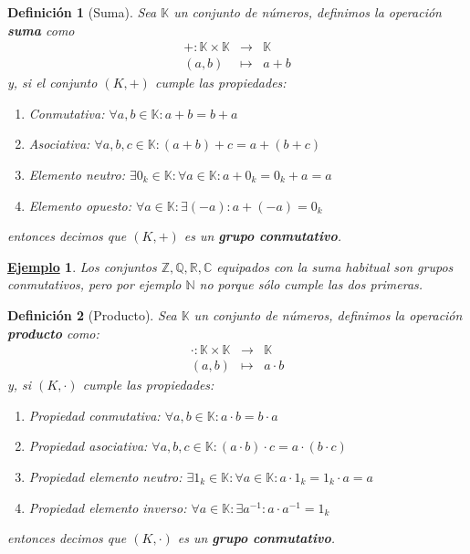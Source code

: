 \documentclass[10pt,a4paper,openright]{book}
\theoremstyle{break}
\newtheorem{defi}{Definición}[chapter]
\newtheorem{ej}{\underline{Ejemplo}}[chapter]
\begin{document}
\begin{defi}[Suma]
Sea $\mathbb K$ un conjunto de números, definimos la operación \textbf{suma} como
\begin{eqnarray*}
+: \mathbb K \times\mathbb K & \longrightarrow & \mathbb K \\
(a,b) & \longmapsto  & a+b
\end{eqnarray*}
y, si el conjunto $(K, +)$ cumple las propiedades:
\begin{enumerate}
\item Conmutativa: $\forall a, b \in \mathbb K: a+b=b+a$
\item Asociativa: $\forall a, b, c\in \mathbb K : (a+b)+c=a+(b+c)$
\item Elemento neutro: $\exists 0_k\in \mathbb K : \forall a \in \mathbb K : a+0_k=0_k+a=a$
\item Elemento opuesto: $\forall a \in \mathbb K : \exists (-a) : a+(-a)=0_k$
\end{enumerate}
entonces decimos que $(K,+)$ es un \textbf{grupo conmutativo}.
\end{defi}

\begin{ej}
Los conjuntos $\mathbb {Z, Q, R, C}$ equipados con la suma habitual son grupos conmutativos, pero por ejemplo $\mathbb N$ no porque sólo cumple las dos primeras.
\end{ej}

\begin{defi}[Producto]
Sea $\mathbb K$ un conjunto de números, definimos la operación \textbf{producto} como:
\begin{eqnarray*}
\cdot: \mathbb K \times\mathbb K & \longrightarrow & \mathbb K \\
(a,b) & \longmapsto  & a\cdot b
\end{eqnarray*}
y, si $(K, \cdot)$ cumple las propiedades:
\begin{enumerate}
\item Propiedad conmutativa: $\forall a, b \in \mathbb K: a\cdot b=b\cdot a$
\item Propiedad asociativa: $\forall a, b, c\in \mathbb K : (a\cdot b)\cdot c=a\cdot (b\cdot c)$
\item Propiedad elemento neutro: $\exists 1_k\in \mathbb K : \forall a \in \mathbb K : a\cdot 1_k=1_k\cdot a=a$
\item Propiedad elemento inverso: $\forall a \in \mathbb K : \exists a^{-1} : a\cdot a^{-1}=1_k$
\end{enumerate}
entonces decimos que $(K,\cdot)$ es un \textbf{grupo conmutativo}.
\end{defi}
\end{document}
